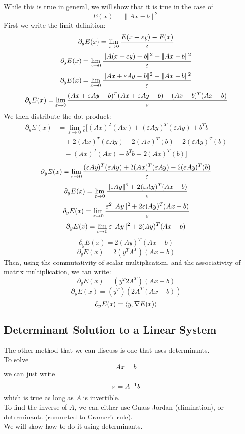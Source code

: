 \documentclass[12pt]{article}
\begin{document}
While this is true in general, we will show
that it is true in the case of
\[ E(x) = \|Ax - b\|^2 \]
First we write the limit definition:
\[ \partial_yE(x) = \lim_{\varepsilon \to 0} \dfrac{E(x + \varepsilon y) - {E(x)}}{\varepsilon}  \]
\[ \partial_yE(x) = \lim_{\varepsilon \to 0} \dfrac{\|A(x+\varepsilon y) - b\|^2 - \|Ax - b\|^2}
{\varepsilon} \]
\[\partial_yE(x) = \lim_{\varepsilon \to 0} \dfrac{\|Ax+ \varepsilon Ay - b\|^2 - \|Ax - b\|^2}
{\varepsilon} \]
\[\partial_yE(x) = \lim_{\varepsilon \to 0} \dfrac{(Ax+ \varepsilon Ay - b)^T
(Ax+ \varepsilon Ay - b)
 - (Ax - b)^T(Ax - b)}
{\varepsilon} \]
We then distribute the dot product:
\begin{align*}
\partial_yE(x) &= \lim_{\varepsilon \to 0} 
\frac{1}{\varepsilon} \Bigg[ 
(Ax)^T(Ax) + (\varepsilon Ay)^T(\varepsilon Ay) 
+ b^Tb \\
&\quad + 2(Ax)^T(\varepsilon Ay) 
- 2(Ax)^T(b) - 2(\varepsilon Ay)^T(b) \\
&\quad - (Ax)^T(Ax) - b^Tb + 2(Ax)^T(b)
\Bigg]
\end{align*}
\[\partial_yE(x) = \lim_{\varepsilon \to 0} \dfrac{ (\varepsilon Ay)^T(\varepsilon Ay)
+ 2(Ax)^T(\varepsilon Ay) - 2(\varepsilon Ay)^T(b)}
{\varepsilon} \]
\[\partial_yE(x) = \lim_{\varepsilon \to 0} \dfrac{ \|\varepsilon Ay\|^2
+ 2(\varepsilon Ay)^T(Ax - b)}
{\varepsilon} \]
\[\partial_yE(x) = \lim_{\varepsilon \to 0} \dfrac{ \varepsilon^2\|Ay\|^2
+ 2\varepsilon(Ay)^T(Ax - b)}
{\varepsilon} \]
\[\partial_yE(x) = \lim_{\varepsilon \to 0} \varepsilon\|Ay\|^2 + 2(Ay)^T(Ax - b) \]
\[\partial_yE(x) = 2(Ay)^T(Ax - b) \]
\[\partial_yE(x) = 2(y^TA^T)(Ax - b) \]
Then, using the commutativity of scalar multiplication,
and the associativity of matrix multiplication,
we can write:
\[\partial_yE(x) = (y^T2A^T)(Ax - b) \]
\[\partial_yE(x) = (y^T)(2A^T(Ax - b)) \]
\[\partial_yE(x) = \left\langle y, \nabla E(x) \right\rangle \]

\newpage

\subsection*{Determinant Solution to a Linear System}

The other method that we can discuss is 
one that uses determinants. \\
To solve
\[ Ax = b \]
we can just write
\[ x = A^{-1} b \]
which is true as long as $A$ is invertible. \\
To find the inverse of $A$,
we can either use Guass-Jordan (elimination),
or determinants (connected to Cramer's rule). \\
We will show how to do it using determinants. \\
\end{document}
